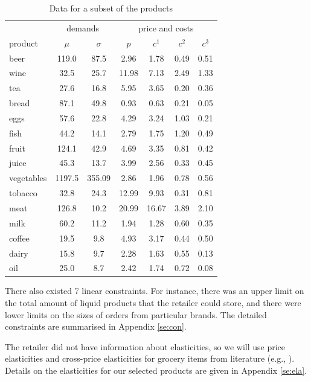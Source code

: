 \documentclass[a4paper,11pt]{article}
\begin{document}
\begin{table}[htb]
\centering
\caption{Data for a subset of the products}
\label{tab:real_par}
\begin{tabular}{lcc cccc}
\toprule
& \multicolumn{2}{c}{demands} & \multicolumn{4}{c}{price and costs}\\
\cmidrule(lr){2-3} \cmidrule(lr){4-7}
product & $\mu$ & $\sigma$ & $p$ & $c^1$ & $c^2$ & $c^3$\\
\midrule
beer & 119.0 & 87.5 & 2.96 & 1.78 & 0.49 & 0.51\\
wine & 32.5 & 25.7 & 11.98 & 7.13 & 2.49 & 1.33\\
tea & 27.6 & 16.8 & 5.95 & 3.65 & 0.20 & 0.36\\
bread & 87.1 & 49.8 & 0.93 & 0.63 & 0.21 & 0.05\\
eggs & 57.6 & 22.8 & 4.29 & 3.24 & 1.03 & 0.21\\
\addlinespace
fish & 44.2 & 14.1 & 2.79 & 1.75 & 1.20 & 0.49\\
fruit & 124.1 & 42.9 & 4.69 & 3.35 & 0.81 & 0.42\\
juice & 45.3 & 13.7 & 3.99 & 2.56 & 0.33 & 0.45\\
vegetables & 1197.5 & 355.09 & 2.86 & 1.96 & 0.78 & 0.56\\
tobacco & 32.8 & 24.3 & 12.99 & 9.93 & 0.31 & 0.81\\
\addlinespace
meat & 126.8 & 10.2 & 20.99 & 16.67 & 3.89 & 2.10\\
milk & 60.2 & 11.2 & 1.94 & 1.28 & 0.60 & 0.35\\
coffee & 19.5 & 9.8 & 4.93 & 3.17 & 0.44 & 0.50\\
dairy & 15.8 & 9.7 & 2.28 & 1.63 & 0.55 & 0.13\\
oil & 25.0 & 8.7 & 2.42 & 1.74 & 0.72 & 0.08\\
\bottomrule
\end{tabular}
\end{table}

There also existed 7 linear constraints. For instance, there was an upper limit on the total amount of liquid products that the retailer could store, and there were lower limits on the sizes of orders from particular brands. The detailed constraints are summarised in Appendix \ref{se:con}.

The retailer did not have information about elasticities, so we will use price elasticities and cross-price elasticities for grocery items from literature (e.g., \cite{HPQ99,LC03,VD99,ZW03}). Details on the elasticities for our selected products are given in Appendix \ref{se:ela}.
\end{document}
